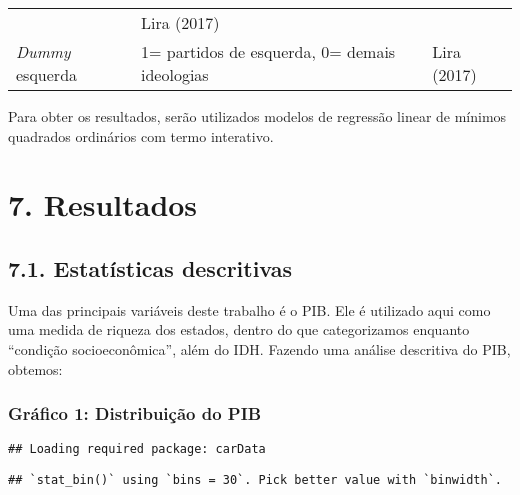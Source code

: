 \documentclass[]{article}
\begin{document}
\begin{longtable}[]{@{}lll@{}}
\begin{minipage}[t]{0.22\columnwidth}
\end{minipage} & \begin{minipage}[t]{0.15\columnwidth}\raggedright\strut
Lira (2017)\strut
\end{minipage}\tabularnewline
\begin{minipage}[t]{0.37\columnwidth}\raggedright\strut
\emph{Dummy} esquerda\strut
\end{minipage} & \begin{minipage}[t]{0.22\columnwidth}\raggedright\strut
1= partidos de esquerda, 0= demais ideologias\strut
\end{minipage} & \begin{minipage}[t]{0.15\columnwidth}\raggedright\strut
Lira (2017)\strut
\end{minipage}\tabularnewline
\bottomrule
\end{longtable}

Para obter os resultados, serão utilizados modelos de regressão linear
de mínimos quadrados ordinários com termo interativo.

\section{7. Resultados}\label{resultados}

\subsection{7.1. Estatísticas
descritivas}\label{estatisticas-descritivas}

Uma das principais variáveis deste trabalho é o PIB. Ele é utilizado
aqui como uma medida de riqueza dos estados, dentro do que categorizamos
enquanto ``condição socioeconômica'', além do IDH. Fazendo uma análise
descritiva do PIB, obtemos:

\newpage

\subsubsection{Gráfico 1: Distribuição do
PIB}\label{grafico-1-distribuicao-do-pib}

\begin{verbatim}
## Loading required package: carData
\end{verbatim}

\begin{verbatim}
## `stat_bin()` using `bins = 30`. Pick better value with `binwidth`.
\end{verbatim}
\end{document}
